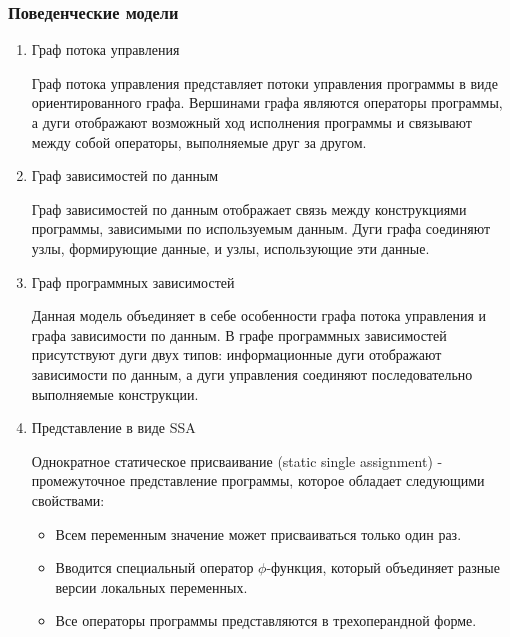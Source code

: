 \subsubsection{Поведенческие модели}


\begin{enumerate}
    \item Граф потока управления

    Граф потока управления представляет потоки управления программы в виде
    ориентированного графа. Вершинами графа являются операторы программы, а дуги
    отображают возможный ход исполнения программы и связывают между собой
    операторы, выполняемые друг за другом.

    \item Граф зависимостей по данным

    Граф зависимостей по данным отображает связь между конструкциями программы,
    зависимыми по используемым данным. Дуги графа соединяют узлы, формирующие
    данные, и узлы, использующие эти данные.

    \item Граф программных зависимостей

    Данная модель объединяет в себе особенности графа потока управления и графа
    зависимости по данным. В графе программных зависимостей присутствуют дуги
    двух типов: информационные дуги отображают зависимости по данным, а
    дуги управления соединяют последовательно выполняемые конструкции.

    \item Представление в виде SSA

    Однократное статическое присваивание (static single assignment) -
    промежуточное представление программы, которое обладает следующими
    свойствами:
        \begin{itemize}
            \item Всем переменным значение может присваиваться только один раз.
            \item Вводится специальный оператор $\phi$-функция, который
            объединяет разные версии локальных переменных.
            \item Все операторы программы представляются в трехоперандной форме.
        \end{itemize}
\end{enumerate}

